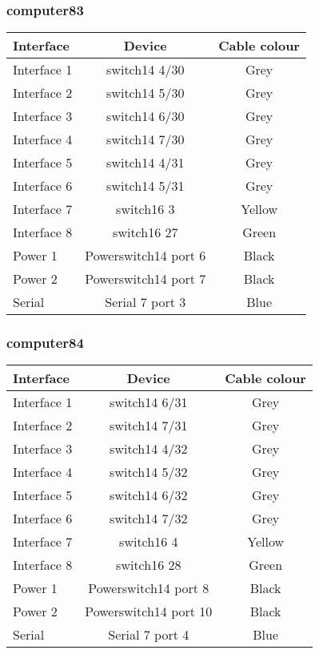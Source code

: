 \subsubsection{computer83}

\begin{table}[H]
\begin{tabular}{|l|c|c|}\hline
Interface & Device & Cable colour \\ \hline
Interface 1 & switch14 4/30 & Grey \\
Interface 2 & switch14 5/30 & Grey \\
Interface 3 & switch14 6/30 & Grey \\
Interface 4 & switch14 7/30 & Grey \\
Interface 5 & switch14 4/31 & Grey \\
Interface 6 & switch14 5/31 & Grey \\
Interface 7 & switch16 3 & Yellow \\
Interface 8 & switch16 27 & Green \\
Power 1 & Powerswitch14 port 6 & Black \\
Power 2 & Powerswitch14 port 7 & Black \\
Serial & Serial 7 port 3 & Blue \\ \hline
\end{tabular}
\end{table}

\subsubsection{computer84}

\begin{table}[H]
\begin{tabular}{|l|c|c|}\hline
Interface & Device & Cable colour \\ \hline
Interface 1 & switch14 6/31 & Grey \\
Interface 2 & switch14 7/31 & Grey \\
Interface 3 & switch14 4/32 & Grey \\
Interface 4 & switch14 5/32 & Grey \\
Interface 5 & switch14 6/32 & Grey \\
Interface 6 & switch14 7/32 & Grey \\
Interface 7 & switch16 4 & Yellow \\
Interface 8 & switch16 28 & Green \\
Power 1 & Powerswitch14 port 8 & Black \\
Power 2 & Powerswitch14 port 10 & Black \\
Serial & Serial 7 port 4 & Blue \\ \hline
\end{tabular}
\end{table}

